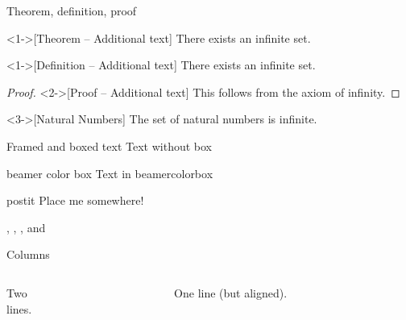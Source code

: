 \begin{frame}{Theorem, definition, proof}
  \begin{theorem}<1->[Theorem – Additional text]
  There exists an infinite set.
  \end{theorem}
  \begin{definition}<1->[Definition – Additional text]
  There exists an infinite set.
  \end{definition}
  \begin{proof}<2->[Proof – Additional text]
  This follows from the axiom of infinity.
  \end{proof}
  \begin{example}<3->[Natural Numbers]
  The set of natural numbers is infinite.
  \end{example}
\end{frame}




\begin{frame}{Framed and boxed text}
  Text without box
  \begin{beamercolorbox}{beamer color box}
    Text in beamercolorbox
  \end{beamercolorbox}
  
  \begin{beamercolorbox}[sep=1em,wd=5cm]{postit}
    Place me somewhere!
  \end{beamercolorbox}
  
  , , , and 
\end{frame}


\begin{frame}{Columns}
  \begin{columns}[t]
    \begin{column}{5cm}
    Two\\lines.
    \end{column}
    \begin{column}{5cm}
    One line (but aligned).
    \end{column}
  \end{columns}
\end{frame}


